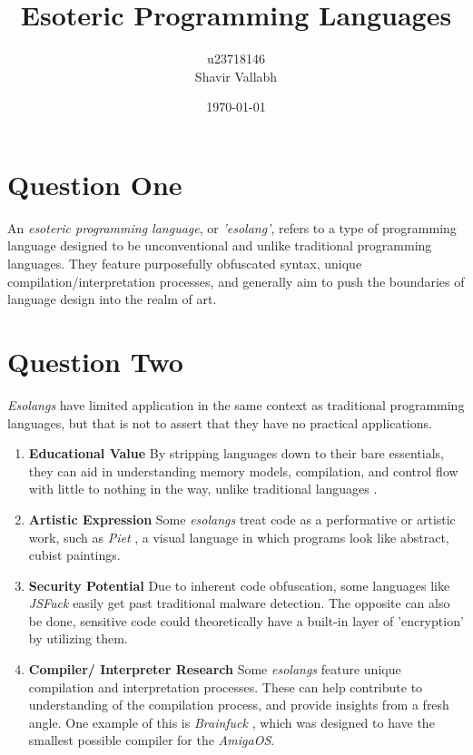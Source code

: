 \documentclass[10pt,a4paper]{article}
\title{\textbf{Esoteric Programming Languages}}
\author{u23718146 \\ Shavir Vallabh}
\date{\today}
\begin{document}
\maketitle
\vspace{1em}

\section{Question One}

An \textit{esoteric programming language}, or \textit{'esolang'}, refers to a type of programming language designed to be unconventional and unlike traditional programming languages. They feature purposefully obfuscated syntax, unique compilation/interpretation processes, and generally aim to push the boundaries of language design into the realm of art. 
\section{Question Two}

\textit{Esolangs} have limited application in the same context as traditional programming languages, but that is not to assert that they have no practical applications.

\begin{enumerate}
    \item \textbf{Educational Value}
    \newline By stripping languages down to their bare essentials, they can aid in understanding memory models, compilation, and control flow with little to nothing in the way, unlike traditional languages \cite{singer2025esolang}.
    
    \item \textbf{Artistic Expression}
    \newline Some \textit{esolangs} treat code as a performative or artistic work, such as \textit{Piet} \citep{piet}, a visual language in which programs look like abstract, cubist paintings.
    
    \item \textbf{Security Potential}
    \newline Due to inherent code obfuscation, some languages like \textit{JSFuck} \citep{jsfuck} easily get past traditional malware detection. The opposite can also be done, sensitive code could theoretically have a built-in layer of 'encryption' by utilizing them.

    \item \textbf{Compiler/ Interpreter Research}
    \newline Some \textit{esolangs} feature unique compilation and interpretation processes. These can help contribute to understanding of the compilation process, and provide insights from a fresh angle. One example of this is \textit{Brainfuck} \citep{brainfuck}, which was designed to have the smallest possible compiler for the \textit{AmigaOS}.
    
\end{enumerate}
\end{document}
